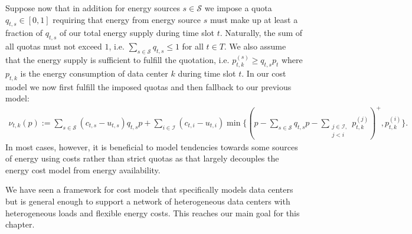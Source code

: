Suppose now that in addition for energy sources $s \in \mathcal{S}$ we impose a quota $q_{t,s} \in [0,1]$ requiring that energy from energy source $s$ must make up at least a fraction of $q_{t,s}$ of our total energy supply during time slot $t$. Naturally, the sum of all quotas must not exceed $1$, i.e. $\sum_{s \in \mathcal{S}} q_{t,s} \leq 1$ for all $t \in T$. We also assume that the energy supply is sufficient to fulfill the quotation, i.e. $p_{t,k}^{(s)} \geq q_{t,s} p_t$ where $p_{t,k}$ is the energy consumption of data center $k$ during time slot $t$. In our cost model we now first fulfill the imposed quotas and then fallback to our previous model: \begin{align*}
    \nu_{t,k}(p) := \sum_{s \in \mathcal{S}} (c_{t,s} - u_{t,s}) q_{t,s} p + \sum_{i \in \mathcal{I}} (c_{t,i} - u_{t,i}) \min\{(p - \sum_{s \in \mathcal{S}} q_{t,s} p - \sum_{\substack{j \in \mathcal{I}, \\ j < i}} p_{t,k}^{(j)})^+, p_{t,k}^{(i)}\}.
\end{align*} In most cases, however, it is beneficial to model tendencies towards some sources of energy using costs rather than strict quotas as that largely decouples the energy cost model from energy availability.

We have seen a framework for cost models that specifically models data centers but is general enough to support a network of heterogeneous data centers with heterogeneous loads and flexible energy costs. This reaches our main goal for this chapter.
